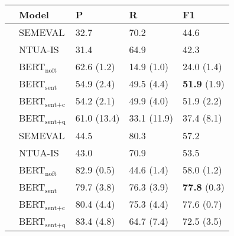 \begin{tabular}{cllll}
	\toprule
    & \textbf{Model} & \textbf{P} & \textbf{R} & \textbf{F1} \\
    \midrule
    {\multirow{6}{*}{\rotatebox{90}{\tiny r/AskParents}}} & SEMEVAL & 32.7 & 70.2 & 44.6 \\
    & NTUA-IS & 31.4 & 64.9 & 42.3 \\
    & BERT$_{\text{noft}}$ & 62.6 (1.2) & 14.9 (1.0) & 24.0 (1.4) \\
    & BERT$_{\text{sent}}$ & 54.9 (2.4) & 49.5 (4.4) & \textbf{51.9} (1.9) \\
    & BERT$_{\text{sent+c}}$ & 54.2 (2.1) & 49.9 (4.0) & 51.9 (2.2) \\
    & BERT$_{\text{sent+q}}$ & 61.0 (13.4) & 33.1 (11.9) & 37.4 (8.1) \\
   \midrule
   {\multirow{6}{*}{\rotatebox{90}{\tiny r/needadvice}}} & SEMEVAL & 44.5 & 80.3 & 57.2 \\
    & NTUA-IS & 43.0 & 70.9 & 53.5 \\
    & BERT$_{\text{noft}}$ & 82.9 (0.5) & 44.6 (1.4) & 58.0 (1.2) \\
    & BERT$_{\text{sent}}$ & 79.7 (3.8) & 76.3 (3.9) & \textbf{77.8} (0.3) \\
    & BERT$_{\text{sent+c}}$ & 80.4 (4.4) & 75.3 (4.4) & 77.6 (0.7) \\
    & BERT$_{\text{sent+q}}$ & 83.4 (4.8) & 64.7 (7.4) & 72.5 (3.5) \\
    \bottomrule
\end{tabular}